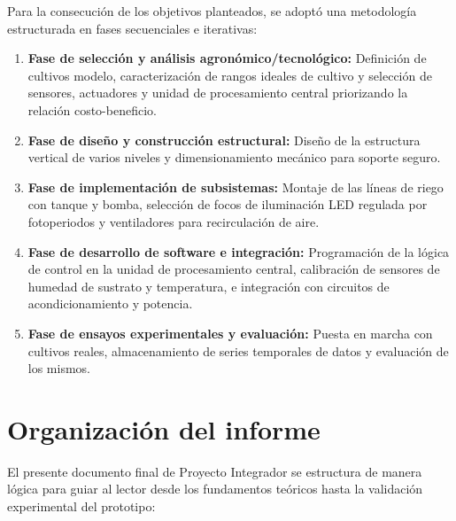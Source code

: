 Para la consecución de los objetivos planteados, se adoptó una metodología estructurada en fases secuenciales e iterativas:
\begin{enumerate}
    \item \textbf{Fase de selección y análisis agronómico/tecnológico:} Definición de cultivos modelo, caracterización de rangos ideales de cultivo y selección de sensores, actuadores y unidad de procesamiento central priorizando la relación costo-beneficio.
    \item \textbf{Fase de diseño y construcción estructural:} Diseño de la estructura vertical de varios niveles y dimensionamiento mecánico para soporte seguro.
    \item \textbf{Fase de implementación de subsistemas:} Montaje de las líneas de riego con tanque y bomba, selección de focos de iluminación LED regulada por fotoperiodos y ventiladores para recirculación de aire.
    \item \textbf{Fase de desarrollo de software e integración:} Programación de la lógica de control en la unidad de procesamiento central, calibración de sensores de humedad de sustrato y temperatura, e integración con circuitos de acondicionamiento y potencia.
    \item \textbf{Fase de ensayos experimentales y evaluación:} Puesta en marcha con cultivos reales, almacenamiento de series temporales de datos y evaluación de los mismos.
\end{enumerate}

\section{Organización del informe}
\label{sec:organizacion}

El presente documento final de Proyecto Integrador se estructura de manera lógica para guiar al lector desde los fundamentos teóricos hasta la validación experimental del prototipo:

